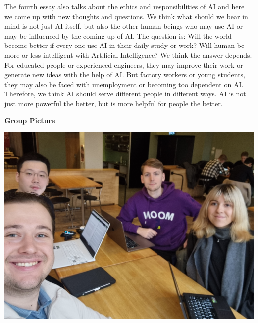 \documentclass[12pt]{article}
\begin{document}
{%



The fourth essay also talks about the ethics and responsibilities of AI and here we come up with new thoughts and questions. We think what should we bear in mind is not just AI itself, but also the other human beings who may use AI or may be influenced by the coming up of AI. The question is: Will the world become better if every one use AI in their daily study or work? Will human be more or less intelligent with Artificial Intelligence? We think the answer depends. For educated people or experienced engineers, they may improve their work or generate new ideas with the help of AI. But factory workers or young students, they may also be faced with unemployment or becoming too dependent on AI. Therefore, we think AI should serve different people in different ways. AI is not just more powerful the better, but is more helpful for people the better. 

}
\newpage
\begin{center}
    \huge
    \textbf{Group Picture}
\end{center}

\includegraphics[width=\textwidth, angle=180]{group.jpg}


\newpage
\end{document}
